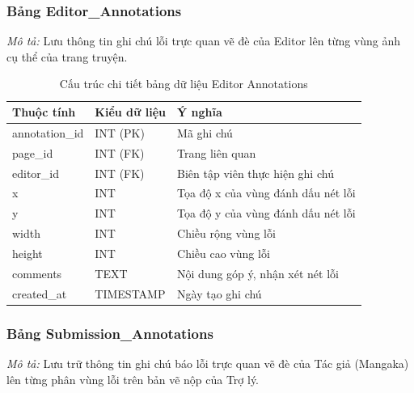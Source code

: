 \subsubsection{Bảng Editor\_Annotations}
\label{subsubsec:tbl_editor_annotations}
\textit{Mô tả:} Lưu thông tin ghi chú lỗi trực quan vẽ đè của Editor lên từng vùng ảnh cụ thể của trang truyện.

\noindent
\begin{table}[H]
\centering
\renewcommand{\arraystretch}{1.3}
\begin{tabularx}{\textwidth}{|p{4cm}|p{3cm}|>{\raggedright\arraybackslash}X|}
\hline
\rowcolor{tableheader}
\textbf{Thuộc tính} & \textbf{Kiểu dữ liệu} & \textbf{Ý nghĩa} \\ \hline
annotation\_id & INT (PK) & Mã ghi chú \\ \hline
page\_id & INT (FK) & Trang liên quan \\ \hline
editor\_id & INT (FK) & Biên tập viên thực hiện ghi chú \\ \hline
x & INT & Tọa độ x của vùng đánh dấu nét lỗi \\ \hline
y & INT & Tọa độ y của vùng đánh dấu nét lỗi \\ \hline
width & INT & Chiều rộng vùng lỗi \\ \hline
height & INT & Chiều cao vùng lỗi \\ \hline
comments & TEXT & Nội dung góp ý, nhận xét nét lỗi \\ \hline
created\_at & TIMESTAMP & Ngày tạo ghi chú \\ \hline
\end{tabularx}
\caption{Cấu trúc chi tiết bảng dữ liệu Editor Annotations}
\label{tab:db_editor_annotations}
\end{table}
\vspace{0.5cm}

\subsubsection{Bảng Submission\_Annotations}
\label{subsubsec:tbl_submission_annotations}
\textit{Mô tả:} Lưu trữ thông tin ghi chú báo lỗi trực quan vẽ đè của Tác giả (Mangaka) lên từng phân vùng lỗi trên bản vẽ nộp của Trợ lý.

